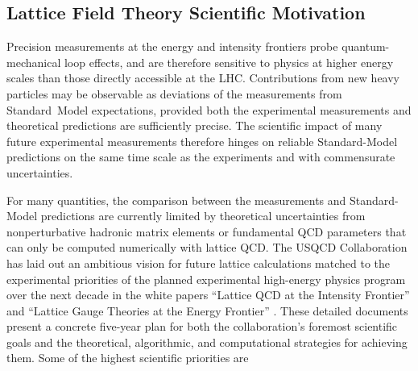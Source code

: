 \subsection{Lattice Field Theory Scientific Motivation}

Precision measurements at the energy and intensity frontiers probe
quantum-mechanical loop effects, and are therefore sensitive to physics at
higher energy scales than those directly accessible at the LHC.  Contributions
from new heavy particles may be observable as deviations of the measurements
from Standard~Model expectations, provided both the experimental measurements
and theoretical predictions are sufficiently precise.  The scientific impact
of many future experimental measurements therefore hinges on reliable
Standard-Model predictions on the same time scale as the experiments and with
commensurate uncertainties.

For many quantities, the comparison between the measurements and
Standard-Model predictions are currently limited by theoretical uncertainties
from nonperturbative hadronic matrix elements or fundamental QCD parameters
that can only be computed numerically with lattice QCD.  The USQCD
Collaboration has laid out an ambitious vision for future lattice calculations
matched to the experimental priorities of the planned experimental high-energy
physics program over the next decade in the white papers ``Lattice QCD at the
Intensity Frontier'' and ``Lattice Gauge Theories at the Energy Frontier''
\cite{USQCD_IF_whitepaper13,USQCD_EF_whitepaper13}.  These detailed documents
present a concrete five-year plan for both the collaboration's foremost
scientific goals and the theoretical, algorithmic, and computational
strategies for achieving them.  Some of the highest scientific priorities are

